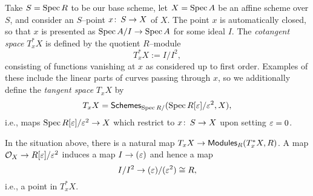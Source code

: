 \begin{definition}\label{DefnOfCoTangentSpaces}
Take $S = \operatorname{Spec} R$ to be our base scheme, let $X = \operatorname{Spec} A$ be an affine scheme over $S$, and consider an $S$--point $x\colon\thinspace S \to X$ of $X$.  The point $x$ is automatically closed, so that $x$ is presented as $\operatorname{Spec} A/I \to \operatorname{Spec} A$ for some ideal $I$.  The \textit{cotangent space} $T^*_x X$ is defined by the quotient $R$--module \[T^*_x X := I / I^2,\] consisting of functions vanishing at $x$ as considered up to first order.  Examples of these include the linear parts of curves passing through $x$, so we additionally define the \textit{tangent space} $T_x X$ by \[T_x X = \mathsf{Schemes}_{\operatorname{Spec} R/}(\operatorname{Spec} R[\varepsilon] / \varepsilon^2, X),\] i.e., maps $\operatorname{Spec} R[\varepsilon] / \varepsilon^2 \to X$ which restrict to $x\colon\thinspace S \to X$ upon setting $\varepsilon = 0$.
\end{definition}

\begin{remark}
In the situation above, there is a natural map $T_x X \to \mathsf{Modules}_R(T^*_x X, R)$.  A map $\mathcal{O}_X \to R[\varepsilon] / \varepsilon^2$ induces a map $I \to (\varepsilon)$ and hence a map \[I / I^2 \to (\varepsilon) / (\varepsilon^2) \cong R,\] i.e., a point in $T^*_x X$.
\end{remark}

